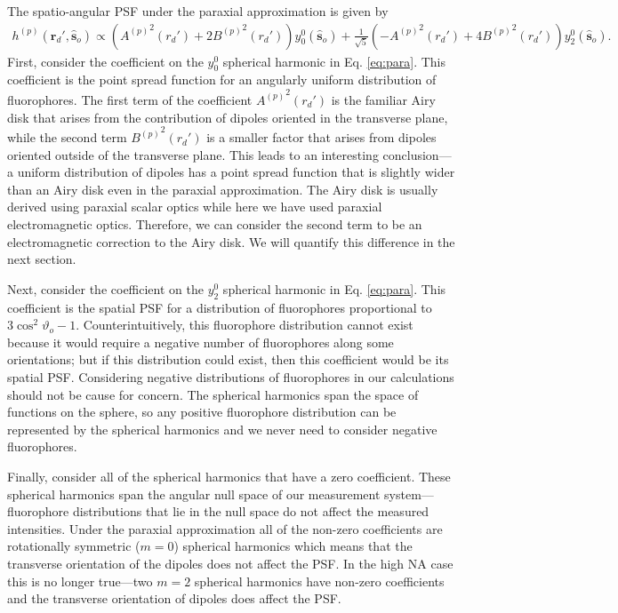 \documentclass[11pt]{article}
\providecommand{\so}[1]{\mathbf{\hat{s}}_o}
\providecommand{\rd}[1]{\mathbf{r}_d}
\begin{document}
The spatio-angular PSF under the paraxial approximation is given by
\begin{align}
      h^{(p)}(\rd{}', \so{}) \propto \left({A^{(p)}}^2(r_d') + 2{B^{(p)}}^2(r_d')\right)y_0^0(\so{}) + \frac{1}{\sqrt{5}}\left(-{A^{(p)}}^2(r_d') + 4{B^{(p)}}^2(r_d')\right)y_2^{0}(\so{})\label{eq:para}.
\end{align}
First, consider the coefficient on the $y_0^0$ spherical harmonic in Eq.
\ref{eq:para}. This coefficient is the point spread function for an angularly
uniform distribution of fluorophores. The first term of the coefficient
${A^{(p)}}^2(r_d')$ is the familiar Airy disk that arises from the contribution
of dipoles oriented in the transverse plane, while the second term
${B^{(p)}}^2(r_d')$ is a smaller factor that arises from dipoles oriented
outside of the transverse plane. This leads to an interesting conclusion---a
uniform distribution of dipoles has a point spread function that is slightly
wider than an Airy disk even in the paraxial approximation. The Airy disk is
usually derived using paraxial scalar optics while here we have used paraxial
electromagnetic optics. Therefore, we can consider the second term to be an
electromagnetic correction to the Airy disk. We will quantify this difference in
the next section.

Next, consider the coefficient on the $y_2^0$ spherical harmonic in
Eq. \ref{eq:para}. This coefficient is the spatial PSF for a distribution of
fluorophores proportional to $3\cos^2\vartheta_o - 1$. Counterintuitively, this
fluorophore distribution cannot exist because it would require a negative number
of fluorophores along some orientations; but if this distribution could exist,
then this coefficient would be its spatial PSF. Considering negative
distributions of fluorophores in our calculations should not be cause for
concern. The spherical harmonics span the space of functions on the sphere, so
any positive fluorophore distribution can be represented by the spherical
harmonics and we never need to consider negative fluorophores.
    
Finally, consider all of the spherical harmonics that have a zero
coefficient. These spherical harmonics span the angular null space of our
measurement system---fluorophore distributions that lie in the null space do not
affect the measured intensities. Under the paraxial approximation all of the
non-zero coefficients are rotationally symmetric ($m=0$) spherical harmonics
which means that the transverse orientation of the dipoles does not affect the
PSF. In the high NA case this is no longer true---two $m=2$ spherical harmonics
have non-zero coefficients and the transverse orientation of dipoles does affect
the PSF.
\end{document}
